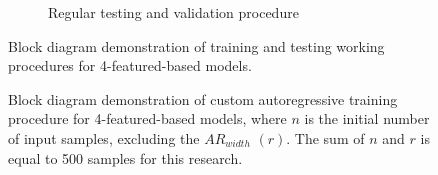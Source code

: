 {\begin{figure}[htbp]
\begin{subfigure}[b]{0.85\textwidth}
            \caption{Regular testing and validation procedure}
            \label{subfig:testing}
        \end{subfigure}
        \caption{Block diagram demonstration of training and testing working procedures for 4-featured-based models.}
        \label{fig:training_testing}
    \end{figure}
} {
    \begin{figure}[!t]
        \centering
        
        \caption{Block diagram demonstration of custom autoregressive training procedure for 4-featured-based models, where $n$ is the initial number of input samples, excluding the $AR_{width}$ $(r)$. The sum of $n$ and $r$ is equal to 500 samples for this research.}
        \label{fig:training_testing}
    \end{figure}
}

